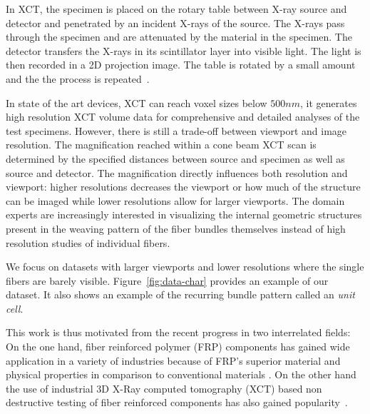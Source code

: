 In XCT, the specimen is  placed on the rotary table between X-ray source and detector and penetrated by an incident X-rays of the source.
The X-rays pass through the specimen and are attenuated by the material in the specimen.
The detector transfers the X-rays in its scintillator layer into visible light. The light is then recorded in a 2D projection image. 
The table is rotated by a small amount and the the process is repeated~\cite{heinzl-2008-thesis}. 


In state of the art devices, XCT can reach voxel sizes below $500 nm$,
it generates high resolution XCT volume data for comprehensive and detailed analyses of the test specimens. However, there is still a trade-off between viewport and image resolution. The magnification reached within a cone beam XCT scan is determined by the specified distances
between source and specimen as well as source and detector. The magnification directly influences both resolution and viewport: higher resolutions decreases the viewport or how much of the structure can be imaged while lower resolutions allow for larger viewports.
The domain experts are increasingly interested in visualizing the internal geometric structures present in the  weaving pattern of the fiber bundles themselves instead of high resolution studies of individual fibers.
 

We focus on datasets with larger viewports and lower resolutions where the single fibers are barely visible. 
Figure~\ref{fig:data-char} provides an example of our dataset. It also shows an example of the recurring bundle pattern called an \textit{unit cell}.

 This work is thus motivated from the recent progress in two interrelated fields: On the one hand, fiber reinforced polymer (FRP) components has gained wide application in a variety of industries  because of FRP's superior material and physical properties in comparison to conventional materials \cite{Karpat2012}. On the other hand the use of industrial 3D X-Ray computed tomography (XCT) based non destructive testing of fiber reinforced components has also gained popularity~\cite{Schilling2005}. 

